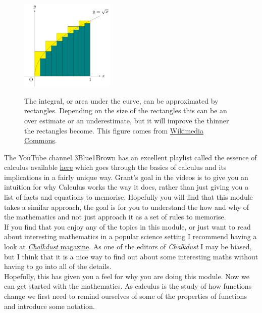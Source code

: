 \begin{figure}[ht]
    \centering
   \includegraphics[width=0.4\textwidth, alt ={A schematic of an integral as the area under the curve.}]{figures/Integral_approximations}
    \caption{The integral, or area under the curve, can be approximated by rectangles. Depending on the size of the rectangles this can be an over estimate or an underestimate, but it will improve the thinner the rectangles become. This figure comes from \href{https://commons.wikimedia.org/wiki/File:Integral\_approximations\_J.svg}{Wikimedia Commons}. }
\label{fig: integral approximation}
\end{figure}
The YouTube channel 3Blue1Brown has an excellent playlist called the essence of calculus available \href{https://www.youtube.com/playlist?list=PLZHQObOWTQDMsr9K-rj53DwVRMYO3t5Yr}{here} which goes through the basics of calculus and its implications in a fairly unique way. Grant's goal in the videos is to give you an intuition for why Calculus works the way it does, rather than just giving you a list of facts and equations to memorise. Hopefully you will find that this module takes a similar approach, the goal is for you to understand the how and why of the mathematics and not just approach it as a set of rules to memorise. \\

If you find that you enjoy any of the topics in this module, or just want to read about interesting mathematics in a popular science setting I recommend having a look at \href{https://chalkdustmagazine.com/}{\textit{\gls{Chalkdust}} magazine}. As one of the editors of \textit{Chalkdust} I may be biased, but I think that it is a nice way to find out about some interesting maths without having to go into all of the details.\\

Hopefully, this has given you a feel for why you are doing this module. Now we can get started with the mathematics. As calculus is the study of how functions change we first need to remind ourselves of some of the properties of functions and introduce some notation.

